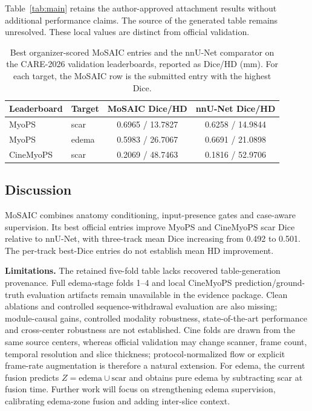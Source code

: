 \documentclass[runningheads]{llncs}
\begin{document}
Table~\ref{tab:main} retains the author-approved attachment results without
additional performance claims. The source of the generated table remains unresolved. These local values
are distinct from official validation.

\begin{table}[t]
\centering
\caption{Best organizer-scored MoSAIC entries and the nnU-Net comparator on the
CARE-2026 validation leaderboards, reported as Dice/HD (mm). For each target, the
MoSAIC row is the submitted entry with the highest Dice.}
\label{tab:leaderboard}
\begin{tabular}{llcc}
\toprule
Leaderboard & Target & MoSAIC Dice/HD & nnU-Net Dice/HD \\
\midrule
MyoPS & scar & 0.6965 / 13.7827 & 0.6258 / 14.9844 \\
MyoPS & edema & 0.5983 / 26.7067 & 0.6691 / 21.0898 \\
CineMyoPS & scar & 0.2069 / 48.7463 & 0.1816 / 52.9706 \\
\bottomrule
\end{tabular}
\end{table}


\FloatBarrier
\subsection{Discussion}

MoSAIC combines anatomy conditioning, input-presence gates and case-aware
supervision. Its best official entries improve MyoPS and CineMyoPS scar Dice
relative to nnU-Net, with three-track mean Dice increasing from 0.492 to 0.501.
The per-track best-Dice entries do not establish mean HD improvement.

\noindent\textbf{Limitations.} The retained five-fold table lacks recovered
table-generation provenance. Full edema-stage folds 1--4 and local CineMyoPS
prediction/ground-truth evaluation artifacts remain unavailable in the evidence
package. Clean ablations and controlled sequence-withdrawal evaluation are also
missing; module-causal gains, controlled modality robustness, state-of-the-art
performance and cross-center robustness are not established. Cine folds are drawn from the same source centers,
whereas official validation may change scanner, frame count, temporal resolution
and slice thickness; protocol-normalized flow or explicit frame-rate augmentation
is therefore a natural extension. For edema, the current fusion predicts
$Z=\text{edema}\cup\text{scar}$ and obtains pure edema by subtracting scar at
fusion time. Further work will focus on strengthening edema supervision,
calibrating edema-zone fusion and adding inter-slice context.
\end{document}
